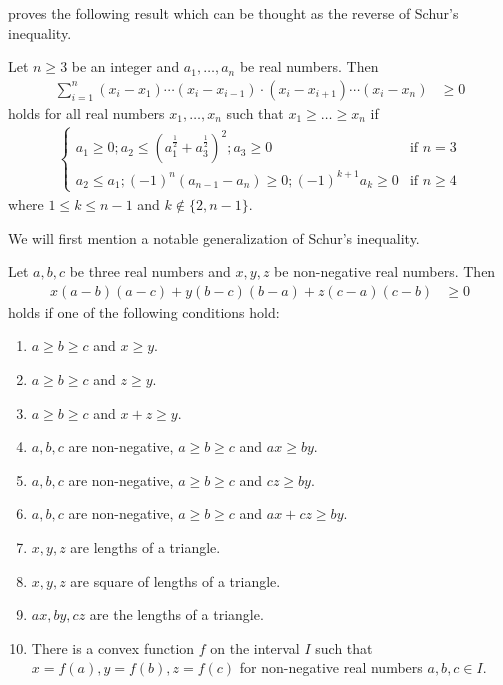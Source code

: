 \documentclass{subfile}
\begin{document}
	\textcite{oppenheim_davies_1964} proves the following result which can be thought as the reverse of Schur's inequality.
		\begin{theorem}
			Let $n\geq 3$ be an integer and $a_{1},\ldots,a_{n}$ be real numbers. Then
				\begin{align*}
					\sum_{i=1}^{n}(x_{i}-x_{1})\cdots(x_{i}-x_{i-1})\cdot(x_{i}-x_{i+1})\cdots(x_{i}-x_{n})
						& \geq 0
				\end{align*}
			holds for all real numbers $x_{1},\ldots,x_{n}$ such that $x_{1}\geq\ldots\geq x_{n}$ if
				\begin{align*}
					\begin{cases}
						a_{1}\geq 0; a_{2}\leq \left(a_{1}^{\frac{1}{2}}+a_{3}^{\frac{1}{2}}\right)^{2};a_{3}\geq 0& \mbox{if }n=3\\
						a_{2}\leq a_{1}; (-1)^{n}(a_{n-1}-a_{n})\geq 0;(-1)^{k+1}a_{k}\geq 0& \mbox{if }n\geq 4
					\end{cases}
				\end{align*}
			where $1\leq k\leq n-1$ and $k\not\in\{2,n-1\}$.
		\end{theorem}
	We will first mention a notable generalization of Schur's inequality.
		\begin{theorem}\label{thm:svm}
			Let $a,b,c$ be three real numbers and $x,y,z$ be non-negative real numbers. Then
				\begin{align*}
					x(a-b)(a-c)+y(b-c)(b-a)+z(c-a)(c-b)
						& \geq 0
				\end{align*}
			holds if one of the following conditions hold:
				\begin{enumerate}[(1)]
					\item $a\geq b\geq c$ and $x\geq y$.
					\item $a\geq b\geq c$ and $z\geq y$.
					\item $a\geq b\geq c$ and $x+z\geq y$.
					\item $a,b,c$ are non-negative, $a\geq b\geq c$ and $ax\geq by$.
					\item $a,b,c$ are non-negative, $a\geq b\geq c$ and $cz\geq by$.
					\item $a,b,c$ are non-negative, $a\geq b\geq c$ and $ax+cz\geq by$.
					\item $x,y,z$ are lengths of a triangle.
					\item $x,y,z$ are square of lengths of a triangle.
					\item $ax,by,cz$ are the lengths of a triangle.
					\item There is a convex function $f$ on the interval $I$ such that $x=f(a),y=f(b),z=f(c)$ for non-negative real numbers $a,b,c\in I$.
				\end{enumerate}
		\end{theorem}
\end{document}

